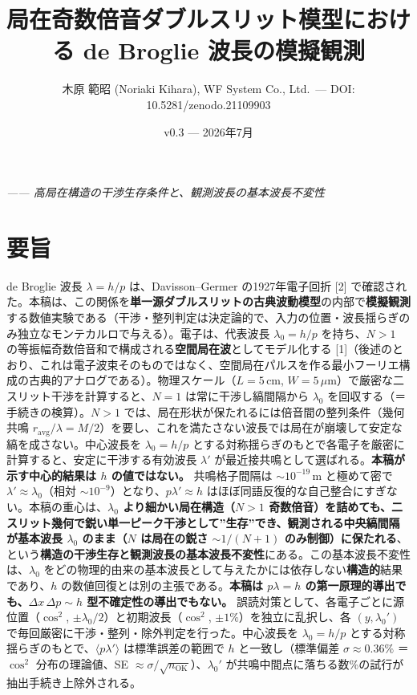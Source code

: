 \documentclass[11pt,a4paper]{ltjsarticle}
\title{局在奇数倍音ダブルスリット模型における de Broglie 波長の模擬観測}
\author{木原 範昭 (Noriaki Kihara), WF System Co., Ltd.~--- DOI:
10.5281/zenodo.21109903}
\date{v0.3 --- 2026年7月}
\begin{document}
\maketitle
\emph{------ 高局在構造の干渉生存条件と、観測波長の基本波長不変性}

\section{要旨}\label{ux8981ux65e8}

de Broglie 波長 \(\lambda=h/p\) は、Davisson--Germer の1927年電子回折
{[}2{]}
で確認された。本稿は、この関係を\textbf{単一源ダブルスリットの古典波動模型}の内部で\textbf{模擬観測}する数値実験である（干渉・整列判定は決定論的で、入力の位置・波長揺らぎのみ独立なモンテカルロで与える）。電子は、代表波長
\(\lambda_0=h/p\) を持ち、\(N>1\)
の等振幅奇数倍音和で構成される\textbf{空間局在波}としてモデル化する
{[}1{]}（後述のとおり、これは電子波束そのものではなく、空間局在パルスを作る最小フーリエ構成の古典的アナログである）。物理スケール（\(L=5\,\mathrm{cm}\),
\(W=5\,\mu\mathrm{m}\)）で厳密な二スリット干渉を計算すると、\(N=1\)
は常に干渉し縞間隔から \(\lambda_0\)
を回収する（＝手続きの検算）。\(N>1\)
では、局在形状が保たれるには倍音間の整列条件（幾何共鳴
\(r_{\mathrm{avg}}/\lambda=M/2\)）を要し、これを満たさない波長では局在が崩壊して安定な縞を成さない。中心波長を
\(\lambda_0=h/p\)
とする対称揺らぎのもとで各電子を厳密に計算すると、安定に干渉する有効波長
\(\lambda'\) が最近接共鳴として選ばれる。\textbf{本稿が示す中心的結果は
\(h\) の値ではない。} 共鳴格子間隔は \(\sim10^{-19}\,\mathrm{m}\)
と極めて密で \(\lambda'\approx\lambda_0\)（相対
\(\sim10^{-9}\)）となり、\(p\lambda'\approx h\)
はほぼ同語反復的な自己整合にすぎない。本稿の重心は、\textbf{\(\lambda_0\)
より細かい局在構造（\(N>1\)
奇数倍音）を詰めても、二スリット幾何で鋭い単一ピーク干渉として''生存''でき、観測される中央縞間隔が基本波長
\(\lambda_0\) のまま（\(N\) は局在の鋭さ \(\sim1/(N{+}1)\)
のみ制御）に保たれる}、という\textbf{構造の干渉生存と観測波長の基本波長不変性}にある。この基本波長不変性は、\(\lambda_0\)
をどの物理的由来の基本波長として与えたかには依存しない\textbf{構造的}結果であり、\(h\)
の数値回復とは別の主張である。\textbf{本稿は \(p\lambda=h\)
の第一原理的導出でも、\(\Delta x\,\Delta p\sim h\)
型不確定性の導出でもない。}
誤読対策として、各電子ごとに源位置（\(\cos^2\),
\(\pm\lambda_0/2\)）と初期波長（\(\cos^2\),
\(\pm1\%\)）を独立に乱択し、各 \((y,\lambda_0')\)
で毎回厳密に干渉・整列・除外判定を行った。中心波長を \(\lambda_0=h/p\)
とする対称揺らぎのもとで、\(\langle p\lambda'\rangle\)
は標準誤差の範囲で \(h\) と一致し（標準偏差 \(\sigma\approx0.36\%\) ＝
\(\cos^2\) 分布の理論値、SE
\(\approx\sigma/\sqrt{n_{\mathrm{OK}}}\)）、\(\lambda_0'\)
が共鳴中間点に落ちる数\%の試行が抽出手続き上除外される。
\end{document}
